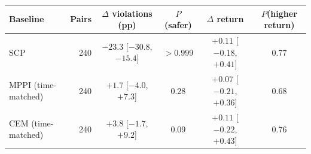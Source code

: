 \begin{tabular}{lrcccc}
\toprule
Baseline & Pairs & $\Delta$ violations (pp) & $P$(safer) & $\Delta$ return & $P$(higher return) \\
\midrule
SCP & 240 & $-23.3$ [$-30.8$, $-15.4$] & $>0.999$ & $+0.11$ [$-0.18$, $+0.41$] & 0.77 \\
MPPI (time-matched) & 240 & $+1.7$ [$-4.0$, $+7.3$] & 0.28 & $+0.07$ [$-0.21$, $+0.36$] & 0.68 \\
CEM (time-matched) & 240 & $+3.8$ [$-1.7$, $+9.2$] & 0.09 & $+0.11$ [$-0.22$, $+0.43$] & 0.76 \\
\bottomrule
\end{tabular}
